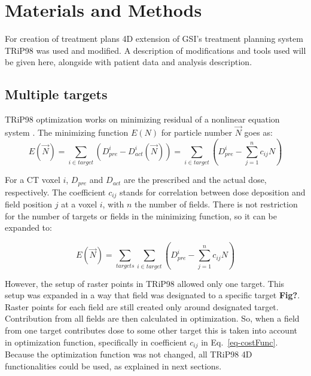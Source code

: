 \documentclass[type=dr, dr=rernat, accentcolor=tud7b,colorbacktitle, bigchapter, openright, twoside, 12pt ]{tudthesis}
\begin{document}

\section{Materials and Methods}

For creation of treatment plans 4D extension of GSI's treatment planning system TRiP98 \cite{Kraemer2000a, Richter2013} was used and modified. A description of modifications and tools used will be given here, 
alongside with patient data and analysis description.

\subsection{Multiple targets}

TRiP98 optimization works on minimizing residual of a nonlinear equation system \cite{Kraemer2000a}. The minimizing function $E(N)$ for particle number $\vec{N}$ goes as:
\begin{equation}
\label{eq-costFunc}
 E(\vec{N}) = \sum_{i\in target} \left( D_{pre}^{i} - D_{act}^{i}(\vec{N})\right) = \sum_{i\in target} \left( D_{pre}^{i} -\sum_{j=1}^n c_{ij}N\right)
\end{equation}

For a CT voxel $i$, $ D_{pre}$ and $D_{act}$ are the prescribed and the actual dose, respectively. The coefficient $c_{ij}$ stands for correlation between dose deposition and field position $j$ at a voxel $i$, with $n$ the number of fields. There is not restriction for the number of targets or fields in the minimizing function, so it can be expanded to:

\begin{equation}
\label{eq-multiCost}
 E(\vec{N}) = \sum_{targets} \sum_{i\in target} \left( D_{pre}^{i} -\sum_{j=1}^n c_{ij}N\right)
\end{equation}

However, the setup of raster points in TRiP98 allowed only one target. This setup was expanded in a way that field was designated to a specific target \textbf{Fig?}. 
Raster points for each field are still created only around designated target. Contribution from all fields are then calculated in optimization. So, when a field from one target contributes 
dose to some other target this is taken into account in optimization function, specifically in coefficient $c_{ij}$ in Eq.~\ref{eq-costFunc}. Because the optimization function was not changed, 
all TRiP98 4D functionalities could be used, as explained in next sections. 
\end{document}
